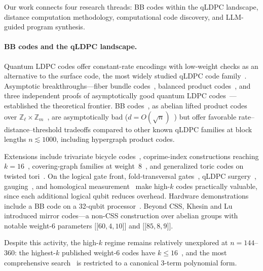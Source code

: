 \documentclass[aps,prxquantum,twocolumn,superscriptaddress,nofootinbib]{revtex4-2}
\newcommand{\ZZ}{\ensuremath{\mathbb{Z}}}
\newcommand{\dblbrk}[1]{\ensuremath{\lbrack\!\lbrack #1 \rbrack\!\rbrack}}
\newcommand{\code}[1]{\dblbrk{#1}}
\begin{document}
Our work connects four research threads: BB codes within the qLDPC landscape, distance computation methodology, computational code discovery, and LLM-guided program synthesis.

\paragraph{BB codes and the qLDPC landscape.}
Quantum LDPC codes offer constant-rate encodings with low-weight checks as an alternative to the surface code, the most widely studied qLDPC code family~\cite{breuckmann2021quantum}. 
Asymptotic breakthroughs---fiber bundle codes~\cite{hastings2021fiber}, balanced product codes~\cite{breuckmann2021balanced}, and three independent proofs of asymptotically good quantum LDPC codes~\cite{panteleev2022asymptotically,leverrier2022quantum,dinur2023good}---established the theoretical frontier.
BB codes~\cite{bravyi2024high}, as abelian lifted product codes over $\ZZ_\ell \times \ZZ_m$~\cite{panteleev2022quantum}, are asymptotically bad ($d = O(\sqrt{n})$~\cite{postema2025existence}) but offer favorable rate--distance--threshold tradeoffs compared to other known qLDPC families at block lengths $n \lesssim 1000$, including hypergraph product codes.

Extensions include trivariate bicycle codes~\cite{voss2025multivariate}, coprime-index constructions reaching $k = 16$~\cite{wang2024coprime,rateadjustable2025}, covering-graph families at weight~8~\cite{symons2025covering}, and generalized toric codes on twisted tori~\cite{liang2025generalized}. 
On the logical gate front, fold-transversal gates~\cite{eberhardt2025logical}, qLDPC surgery~\cite{cross2024improved}, gauging~\cite{williamson2024gauging}, and homological measurement~\cite{ide2024homological} make high-$k$ codes practically valuable, since each additional logical qubit reduces overhead.
Hardware demonstrations include a BB code on a 32-qubit processor~\cite{wang2025demonstration}. 
Beyond CSS, Khesin and Lu~\cite{khesin2026mirror} introduced mirror codes---a non-CSS construction over abelian groups with notable weight-6 parameters $\code{60,4,10}$ and $\code{85,8,9}$. 

Despite this activity, the high-$k$ regime remains relatively unexplored at $n = 144$--$360$: the highest-$k$ published weight-6 codes have $k \leq 16$~\cite{bravyi2024high,wang2024coprime}, and the most comprehensive search~\cite{liang2025generalized} is restricted to a canonical 3-term polynomial form.
\end{document}
